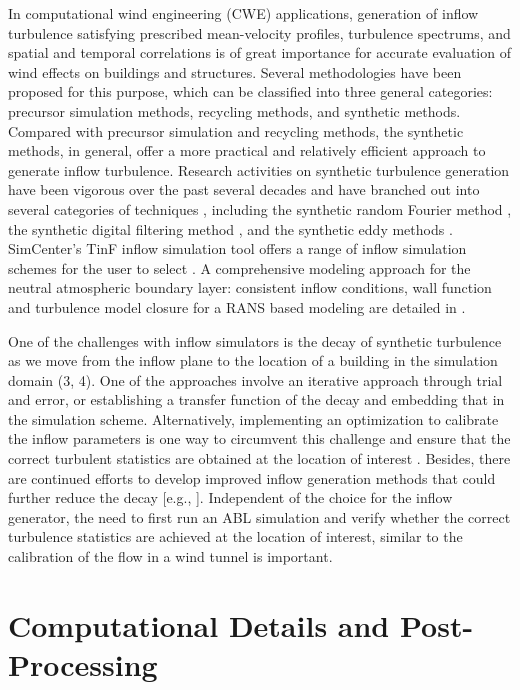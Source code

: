 In computational wind engineering (CWE) applications, generation of inflow turbulence satisfying prescribed mean-velocity profiles, turbulence spectrums, and spatial and temporal correlations is of great importance for accurate evaluation of wind effects on buildings and structures. Several methodologies have been proposed for this purpose, which can be classified into three general categories: precursor simulation methods, recycling methods, and synthetic methods. Compared with precursor simulation and recycling methods, the synthetic methods, in general, offer a more practical and relatively efficient approach to generate inflow turbulence. Research activities on synthetic turbulence generation have been vigorous over the past several decades and have branched out into several categories of techniques \citep{wu2017inflow}, including the synthetic random Fourier method \citep{kraichnan1970diffusion, hoshiya1972simulation}, the synthetic digital filtering method \citep{klein2003digital}, and the synthetic eddy methods \citep{jarrin2006syntheticeddymethod}. SimCenter's TinF inflow simulation tool offers a range of inflow simulation schemes for the user to select \citep{tinf2020}. A comprehensive modeling approach for the neutral atmospheric boundary layer: consistent inflow conditions, wall function and turbulence model closure for a RANS based modeling are detailed in \citep{parente2011comprehensive}.

One of the challenges with inflow simulators is the decay of synthetic turbulence as we move from the inflow plane to the location of a building in the simulation domain (3, 4). One of the approaches involve an iterative approach through trial and error, or establishing a transfer function of the decay and embedding that in the simulation scheme. Alternatively,  implementing an optimization to calibrate the inflow parameters is one way to circumvent this challenge and ensure that the correct turbulent statistics are obtained at the location of interest \citep{lamberti2018optimizing}. Besides, there are continued efforts to develop improved inflow generation methods that could further reduce the decay [e.g., \citep{bervida2020synthetic}]. Independent of the choice for the inflow generator, the need to first run an ABL simulation and verify whether the correct turbulence statistics are achieved at the location of interest, similar to the calibration of the flow in a wind tunnel is important.


\section{Computational Details and Post-Processing}
\label{sec:resp_cfd_wind_flow_modeling}

